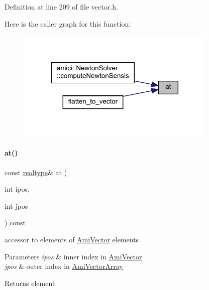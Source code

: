 Definition at line 209 of file vector.\+h.

Here is the caller graph for this function\+:
\nopagebreak
\begin{figure}[H]
\begin{center}
\leavevmode
\includegraphics[width=269pt]{classamici_1_1_ami_vector_array_a214f110ad614eb97ec2c6f3b6a9f2c8c_icgraph}
\end{center}
\end{figure}
\mbox{\label{classamici_1_1_ami_vector_array_ab5d671e207475d1f45227a7faaeebfac}} 
\paragraph{\texorpdfstring{at()}{at()}\hspace{0.1cm}{\footnotesize\ttfamily [2/2]}}
{\footnotesize\ttfamily const \mbox{\hyperlink{namespaceamici_a1bdce28051d6a53868f7ccbf5f2c14a3}{realtype}}\& at (\begin{DoxyParamCaption}\item[{int}]{ipos,  }\item[{int}]{jpos }\end{DoxyParamCaption}) const}

accessor to elements of \mbox{\hyperlink{classamici_1_1_ami_vector}{Ami\+Vector}} elements 
\begin{DoxyParams}{Parameters}
{\em ipos} & inner index in \mbox{\hyperlink{classamici_1_1_ami_vector}{Ami\+Vector}} \\
\hline
{\em jpos} & outer index in \mbox{\hyperlink{classamici_1_1_ami_vector_array}{Ami\+Vector\+Array}} \\
\hline
\end{DoxyParams}
\begin{DoxyReturn}{Returns}
element 
\end{DoxyReturn}


